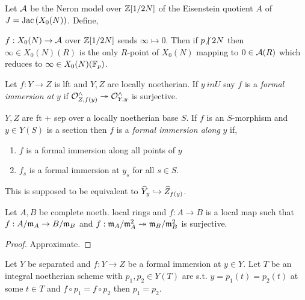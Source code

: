 \documentclass[12pt]{article}
\begin{document}
\begin{prop}
Let $\mathcal{A}$ be the Neron model over $\mathbb{Z}[1/2N]$ of the Eisenstein quotient $A$ of $J = \mathrm{Jac}\left( X_0(N) \right)$. Define,
\begin{center}
\end{center}
$f : X_0(N) \to \mathcal{A}$ over $\mathbb{Z}[1/2N]$ sends $\infty \mapsto 0$.
Then if $p \ndivides 2 N$ then $\infty \in X_0(N)(R)$ is the only $R$-point of $X_0(N)$ mapping to $0 \in \mathcal{A}(R)$ which reduces to $\infty \in X_0(N)(\mathbb{F}_p)$. 
\end{prop}

\begin{defn}
Let $f : Y \to Z$ is lft and $Y,Z$ are locally noetherian. If $y\ in U$ say $f$ is a \textit{formal immersion at} $y$ if $\mathcal{O}_{Z, f(y)}^\wedge \twoheadrightarrow \mathcal{O}_{Y, y}^\wedge$ is surjective.
\end{defn}

\begin{defn}
$Y, Z$ are ft + sep over a locally noetherian base $S$. If $f$ is an $S$-morphism and $y \in Y(S)$ is a section then $f$ is a \textit{formal immersion along} $y$ if,
\begin{enumerate}
\item $f$ is a formal immersion along all points of $y$
\item $f_s$ is a formal immersion at $y_s$ for all $s \in S$.  
\end{enumerate}
\end{defn}

\begin{rmk}
This is supposed to be equivalent to $\widehat{Y}_y \hookrightarrow \widehat{Z}_{f(y)}$. 
\end{rmk}

\begin{lemma}
Let $A, B$ be complete noeth. local rings and $f : A \to B$ is a local map such that $f : A / \mathfrak{m}_A \to B / \mathfrak{m}_B$ and $f : \mathfrak{m}_A / \mathfrak{m}_A^2 \twoheadrightarrow \mathfrak{m}_B / \mathfrak{m}_B^2$ is surjective. 
\end{lemma}

\begin{proof}
Approximate. 
\end{proof}

\begin{prop}
Let $Y$ be separated and $f : Y \to Z$ be a formal immersion at $y \in Y$. Let $T$ be an integral noetherian scheme with $p_1, p_2 \in Y(T)$ are s.t. $y = p_1(t) = p_2(t)$ at some $t \in T$ and $f \circ p_1 = f \circ p_2$ then $p_1 = p_2$. 
\end{prop}
\end{document}
